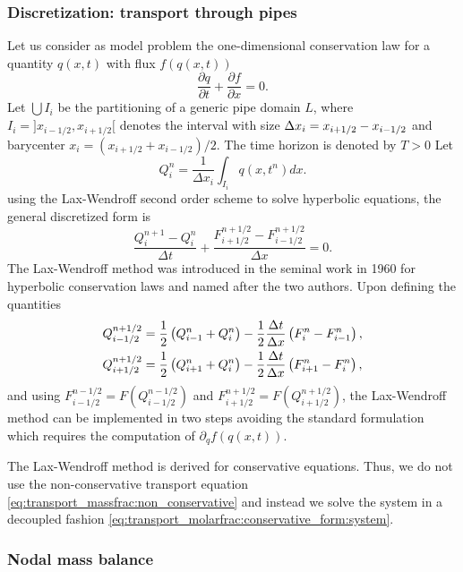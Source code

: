 \subsubsection{Discretization: transport through pipes}
Let us consider as model problem the one-dimensional conservation law for a quantity $q(x,t)$ with flux $f(q(x,t))$
\begin{equation}
    \frac{\partial q}{\partial t}+ \frac{\partial f}{\partial x}=0.
    \label{eq:general:continuous}
\end{equation}
Let $\bigcup I_i $ be the partitioning of a generic pipe domain $L$, where $I_i = ] x_{i-1/2}, x_{i+1/2}[$ denotes the interval with size $\Delta x_i = x_{i+1/2} - x_{i-1/2}$ and barycenter $x_i = (x_{i+1/2} + x_{i-1/2}) /2$.  The time horizon is denoted by  $T>0$
Let 
\[
    Q_i^n=\frac{1}{\Delta x_i} \int_{I_i} q(x, t^n) d x.
\]
using the Lax-Wendroff second order scheme to solve hyperbolic equations, the general discretized form is
\begin{equation}
    \frac{Q_i^{n+1}-Q_i^n}{\Delta t}+\frac{F_{i+1/2}^{n+1/2}-F_{i-1/2}^{n+1/2}}{\Delta x}=0.    
\label{eq:general:discretized}
\end{equation}
The Lax-Wendroff method was introduced in the seminal work \cite{LaxWendroff1960} in 1960 for hyperbolic conservation laws and named after the two authors. Upon defining the quantities
\[ 
    \begin{aligned}
     Q_{i-1/2}^{n+1/2}&=\frac{1}{2}  \left(Q_{i-1}^n+Q_i^n\right)-\frac{1}{2} \frac{\Delta t}{\Delta x}  \left(F_{i}^n-F_{i-1}^n\right), \\
    Q_{i+1/2}^{n+1/2}&=\frac{1}{2}  \left(Q_{i+1}^n+Q_i^n\right)-\frac{1}{2} \frac{\Delta t}{\Delta x}  \left(F_{i+1}^n-F_{i}^n\right), \\
     \end{aligned}
\]
and using $F^{n-1/2}_{i-1/2} = F(Q_{i-1/2}^{n-1/2})$ and $F_{i+1/2}^{n+1/2} = F(Q_{i+1/2}^{n+1/2})$, the Lax-Wendroff method can be implemented in two steps avoiding the standard formulation which requires the computation of $\partial_q f(q(x,t))$. 

The Lax-Wendroff method is derived for conservative equations. Thus, we do not use the non-conservative transport equation \eqref{eq:transport_massfrac:non_conservative} and instead we solve the system in a decoupled fashion \eqref{eq:transport_molarfrac:conservative_form:system}. 

\subsubsection{Nodal mass balance}

